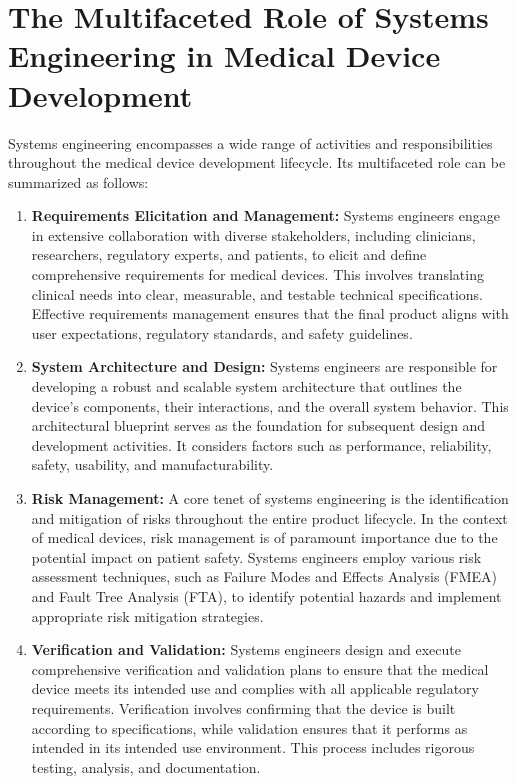 \documentclass[conference]{IEEEtran}
\begin{document}
\section{The Multifaceted Role of Systems Engineering in Medical Device Development}

    Systems engineering encompasses a wide range of activities and 
    responsibilities throughout the medical device development 
    lifecycle. Its multifaceted role can be summarized as follows:

    \begin{enumerate}
        \item \textbf{Requirements Elicitation and Management:} Systems 
        engineers engage in extensive collaboration with diverse stakeholders, 
        including clinicians, researchers, regulatory experts, and patients, 
        to elicit and define comprehensive requirements for medical devices. 
        This involves translating clinical needs into clear, measurable, 
        and testable technical specifications. Effective requirements 
        management ensures that the final product aligns with user 
        expectations, regulatory standards, and safety guidelines.
        
        \item \textbf{System Architecture and Design:} Systems engineers are 
        responsible for developing a robust and scalable system architecture 
        that outlines the device's components, their interactions, and the 
        overall system behavior. This architectural blueprint serves as the 
        foundation for subsequent design and development activities. It 
        considers factors such as performance, reliability, safety, usability, 
        and manufacturability.

        \item \textbf{Risk Management:} A core tenet of systems engineering 
        is the identification and mitigation of risks throughout the entire 
        product lifecycle. In the context of medical devices, risk management 
        is of paramount importance due to the potential impact on patient 
        safety. Systems engineers employ various risk assessment techniques, 
        such as Failure Modes and Effects Analysis (FMEA) and Fault Tree 
        Analysis (FTA), to identify potential hazards and implement 
        appropriate risk mitigation strategies. %

        \item \textbf{Verification and Validation:} Systems engineers design 
        and execute comprehensive verification and validation plans to 
        ensure that the medical device meets its intended use and complies 
        with all applicable regulatory requirements. Verification involves 
        confirming that the device is built according to specifications, 
        while validation ensures that it performs as intended in its 
        intended use environment. This process includes rigorous testing, 
        analysis, and documentation.


\end{enumerate}
\end{document}
